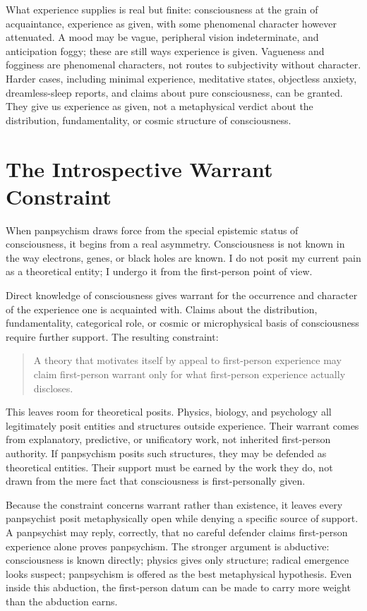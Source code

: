 What experience supplies is real but finite: consciousness at the grain of acquaintance, experience as given, with some phenomenal character however attenuated. A mood may be vague, peripheral vision indeterminate, and anticipation foggy; these are still ways experience is given. Vagueness and fogginess are phenomenal characters, not routes to subjectivity without character. Harder cases, including minimal experience, meditative states, objectless anxiety, dreamless-sleep reports, and claims about pure consciousness, can be granted. They give us experience as given, not a metaphysical verdict about the distribution, fundamentality, or cosmic structure of consciousness.

\section{The Introspective Warrant Constraint}

When panpsychism draws force from the special epistemic status of consciousness, it begins from a real asymmetry. Consciousness is not known in the way electrons, genes, or black holes are known. I do not posit my current pain as a theoretical entity; I undergo it from the first-person point of view.

Direct knowledge of consciousness gives warrant for the occurrence and character of the experience one is acquainted with. Claims about the distribution, fundamentality, categorical role, or cosmic or microphysical basis of consciousness require further support. The resulting constraint:

\begin{quote}
A theory that motivates itself by appeal to first-person experience may claim first-person warrant only for what first-person experience actually discloses.
\end{quote}

This leaves room for theoretical posits. Physics, biology, and psychology all legitimately posit entities and structures outside experience. Their warrant comes from explanatory, predictive, or unificatory work, not inherited first-person authority. If panpsychism posits such structures, they may be defended as theoretical entities. Their support must be earned by the work they do, not drawn from the mere fact that consciousness is first-personally given.

Because the constraint concerns warrant rather than existence, it leaves every panpsychist posit metaphysically open while denying a specific source of support. A panpsychist may reply, correctly, that no careful defender claims first-person experience alone proves panpsychism. The stronger argument is abductive: consciousness is known directly; physics gives only structure; radical emergence looks suspect; panpsychism is offered as the best metaphysical hypothesis. Even inside this abduction, the first-person datum can be made to carry more weight than the abduction earns.

